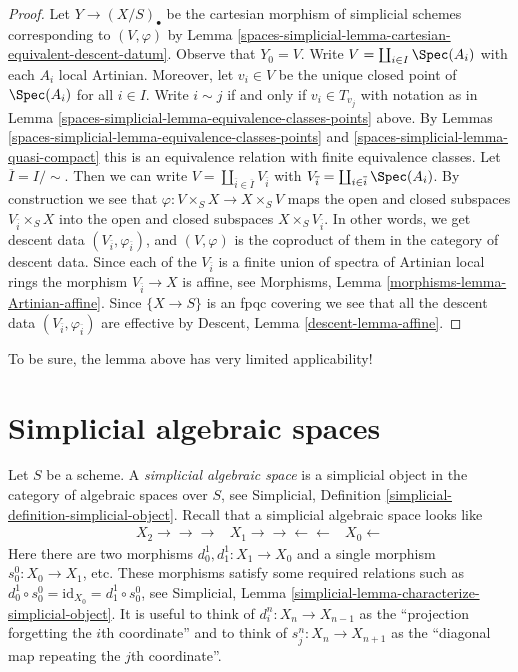 \begin{proof}
Let $Y \to (X/S)_\bullet$ be the cartesian morphism of simplicial
schemes corresponding to $(V, \varphi)$ by
Lemma \ref{spaces-simplicial-lemma-cartesian-equivalent-descent-datum}.
Observe that $Y_0 = V$.
Write $V = \coprod_{i \in I} \Spec(A_i)$ with each $A_i$ local
Artinian. Moreover, let $v_i \in V$ be the unique closed point of
$\Spec(A_i)$ for all $i \in I$. Write $i \sim j$ if and only if
$v_i \in T_{v_j}$ with notation as in
Lemma \ref{spaces-simplicial-lemma-equivalence-classes-points} above.
By Lemmas \ref{spaces-simplicial-lemma-equivalence-classes-points} and \ref{spaces-simplicial-lemma-quasi-compact}
this is an equivalence relation with finite equivalence
classes. Let $\overline{I} = I/\sim$. Then we can write
$V = \coprod_{\overline{i} \in \overline{I}} V_{\overline{i}}$
with
$V_{\overline{i}} = \coprod_{i \in \overline{i}} \Spec(A_i)$.
By construction we see that
$\varphi : V \times_S X \to X \times_S V$ maps
the open and closed subspaces $V_{\overline{i}} \times_S X$
into the open and closed subspaces $X \times_S V_{\overline{i}}$.
In other words, we get descent data
$(V_{\overline{i}}, \varphi_{\overline{i}})$, and
$(V, \varphi)$ is the coproduct of them in the category of
descent data.
Since each of the $V_{\overline{i}}$ is a finite union of
spectra of Artinian local rings the morphism $V_{\overline{i}} \to X$
is affine, see Morphisms, Lemma \ref{morphisms-lemma-Artinian-affine}.
Since $\{X \to S\}$ is an fpqc covering we see that all
the descent data $(V_{\overline{i}}, \varphi_{\overline{i}})$ are effective
by Descent, Lemma \ref{descent-lemma-affine}.
\end{proof}

To be sure, the lemma above has very limited applicability!

\section{Simplicial algebraic spaces}
\label{spaces-simplicial-section-simplicial-algebraic-spaces}
Let $S$ be a scheme. A {\it simplicial algebraic space}
is a simplicial object in the category of algebraic spaces over $S$,
see Simplicial, Definition \ref{simplicial-definition-simplicial-object}.
Recall that a simplicial algebraic space looks like
$$
\begin{array}{ccc}X_2
\longrightarrow\longrightarrow\longrightarrow & X_1
\longrightarrow\longrightarrow\longleftarrow\longleftarrow & X_0
\longleftarrow\end{array}
$$
Here there are two morphisms $d^1_0, d^1_1 : X_1 \to X_0$
and a single morphism $s^0_0 : X_0 \to X_1$, etc.
These morphisms satisfy some required relations such as
$d^1_0 \circ s^0_0 = \text{id}_{X_0} = d^1_1 \circ s^0_0$, see
Simplicial, Lemma \ref{simplicial-lemma-characterize-simplicial-object}.
It is useful to think of $d^n_i : X_n \to X_{n - 1}$
as the ``projection forgetting the $i$th coordinate'' and
to think of $s^n_j : X_n \to X_{n + 1}$ as the ``diagonal map repeating
the $j$th coordinate''.

